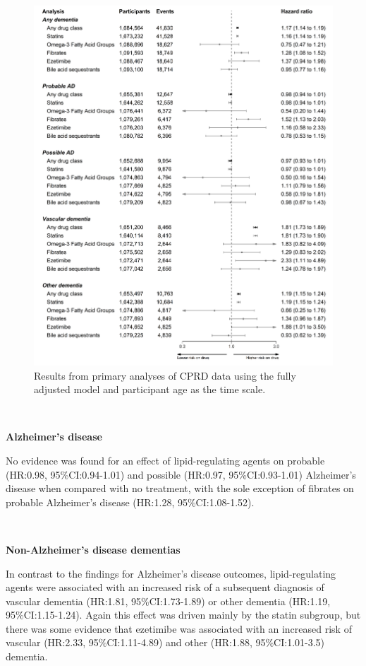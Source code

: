 \documentclass[a4paper, twoside]{templates/ociamthesis}
\begin{document}
\begin{figure}[H]
\includegraphics[width=1\linewidth]{figures/cprd-analysis/forester_p1} \caption[Results from primary analyses of CPRD data]{Results from primary analyses of CPRD data using the fully adjusted model and participant age as the time scale.}\label{fig:cprdPrimary}
\end{figure}

~

\textbf{Alzheimer's disease}

No evidence was found for an effect of lipid-regulating agents on probable (HR:0.98, 95\%CI:0.94-1.01) and possible (HR:0.97, 95\%CI:0.93-1.01) Alzheimer's disease when compared with no treatment, with the sole exception of fibrates on probable Alzheimer's disease (HR:1.28, 95\%CI:1.08-1.52).

~

\textbf{Non-Alzheimer's disease dementias}

In contrast to the findings for Alzheimer's disease outcomes, lipid-regulating agents were associated with an increased risk of a subsequent diagnosis of vascular dementia (HR:1.81, 95\%CI:1.73-1.89) or other dementia (HR:1.19, 95\%CI:1.15-1.24). Again this effect was driven mainly by the statin subgroup, but there was some evidence that ezetimibe was associated with an increased risk of vascular (HR:2.33, 95\%CI:1.11-4.89) and other (HR:1.88, 95\%CI:1.01-3.5) dementia.
\end{document}
